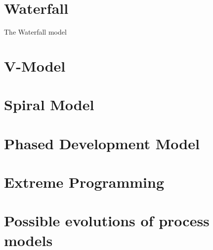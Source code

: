 \documentclass{style/CRPITStyle}
\renewcommand{\cite}{\citep}
\begin{document}
\section{Waterfall} %

The Waterfall model \cite{Waterfall:1970}

\section{V-Model} %

\section{Spiral Model} %

\section{Phased Development Model} %

\section{Extreme Programming} %

\section{Possible evolutions of process models}




\end{document}
